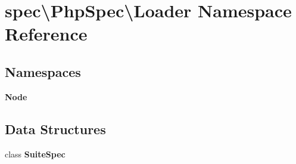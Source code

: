 \section{spec\textbackslash{}Php\+Spec\textbackslash{}Loader Namespace Reference}
\label{namespacespec_1_1_php_spec_1_1_loader}
\subsection*{Namespaces}
\begin{DoxyCompactItemize}
\item 
 {\bf Node}
\end{DoxyCompactItemize}
\subsection*{Data Structures}
\begin{DoxyCompactItemize}
\item 
class {\bf Suite\+Spec}
\end{DoxyCompactItemize}

